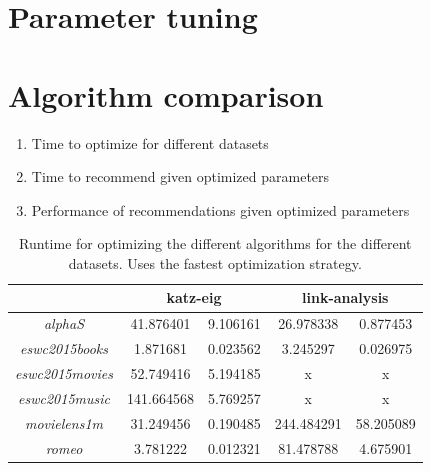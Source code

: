 
\section{Parameter tuning}



\newpage


\newpage


\section{Algorithm comparison}



\begin{enumerate}
    \item Time to optimize for different datasets
    \item Time to recommend given optimized parameters
    \item Performance of recommendations given optimized parameters
\end{enumerate}

\begin{table}[h!]
    \centering
    \begin{tabular}{| c | c | c | c | c |}
        \hline
        \textbf{}               & \multicolumn{2}{c|}{\textbf{katz-eig}} & \multicolumn{2}{c|}{\textbf{link-analysis}} \\ \hline
        \textit{alphaS}         & 41.876401     & 9.106161         & 26.978338     & 0.877453      \\ \hline
        \textit{eswc2015books}  & 1.871681      & 0.023562         & 3.245297      & 0.026975      \\ \hline
        \textit{eswc2015movies} & 52.749416     & 5.194185         & x             & x             \\ \hline
        \textit{eswc2015music}  & 141.664568    & 5.769257         & x             & x             \\ \hline
        \textit{movielens1m}    & 31.249456     & 0.190485         & 244.484291    & 58.205089     \\ \hline
        \textit{romeo}          & 3.781222      & 0.012321         & 81.478788     & 4.675901      \\ \hline
    \end{tabular}
    \caption{Runtime for optimizing the different algorithms for the different datasets. Uses the fastest optimization strategy.}
    \label{tab:alg_full_time}
\end{table}

